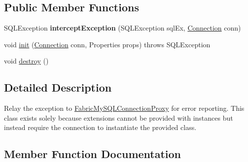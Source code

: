 \subsection*{Public Member Functions}
\begin{DoxyCompactItemize}
\item 
\mbox{\label{classcom_1_1mysql_1_1fabric_1_1jdbc_1_1_error_reporting_exception_interceptor_aa086bc4cc6dc73c457997a8c5b102822}} 
S\+Q\+L\+Exception {\bfseries intercept\+Exception} (S\+Q\+L\+Exception sql\+Ex, \mbox{\hyperlink{interfacecom_1_1mysql_1_1jdbc_1_1_connection}{Connection}} conn)
\item 
void \mbox{\hyperlink{classcom_1_1mysql_1_1fabric_1_1jdbc_1_1_error_reporting_exception_interceptor_a8c67e1a183a6c155dd67287d43c623fb}{init}} (\mbox{\hyperlink{interfacecom_1_1mysql_1_1jdbc_1_1_connection}{Connection}} conn, Properties props)  throws S\+Q\+L\+Exception 
\item 
void \mbox{\hyperlink{classcom_1_1mysql_1_1fabric_1_1jdbc_1_1_error_reporting_exception_interceptor_a82f6c205f93e57741f419403ed4f0981}{destroy}} ()
\end{DoxyCompactItemize}


\subsection{Detailed Description}
Relay the exception to \mbox{\hyperlink{classcom_1_1mysql_1_1fabric_1_1jdbc_1_1_fabric_my_s_q_l_connection_proxy}{Fabric\+My\+S\+Q\+L\+Connection\+Proxy}} for error reporting. This class exists solely because extensions cannot be provided with instances but instead require the connection to instantiate the provided class. 

\subsection{Member Function Documentation}
\mbox{\label{classcom_1_1mysql_1_1fabric_1_1jdbc_1_1_error_reporting_exception_interceptor_a82f6c205f93e57741f419403ed4f0981}} 
